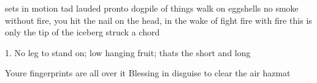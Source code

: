 \begin{center}
\end{center}

sets in motion
tad
lauded
pronto
dogpile of things
walk on eggshells
no smoke without fire, you hit the nail on the head, in the wake of
fight fire with fire
this is only the tip of the iceberg
struck a chord

1. No leg to stand on; low hanging fruit; thats the short and long

Youre fingerprints are all over it
Blessing in disguise
to clear the air
hazmat

